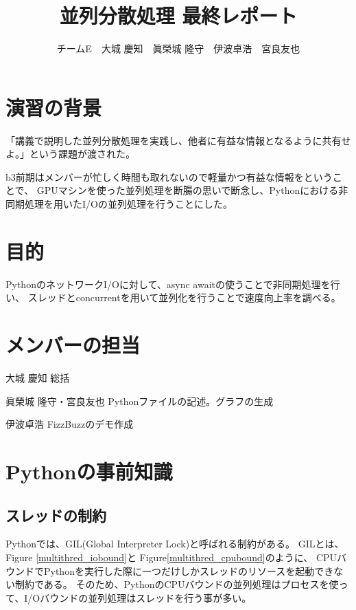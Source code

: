 \documentclass[14pt, oneside]{article}     	%
\title{並列分散処理  最終レポート}
\author{チームE　大城 慶知　眞榮城 隆守　伊波卓浩　宮良友也}
\begin{document}
\maketitle

%

\section{演習の背景}
「講義で説明した並列分散処理を実践し、他者に有益な情報となるように共有せよ。」という課題が渡された。

b3前期はメンバーが忙しく時間も取れないので軽量かつ有益な情報をということで、
GPUマシンを使った並列処理を断腸の思いで断念し、Pythonにおける非同期処理を用いたI/Oの並列処理を行うことにした。

\section{目的}
PythonのネットワークI/Oに対して、async awaitの使うことで非同期処理を行い、
スレッドとconcurrentを用いて並列化を行うことで速度向上率を調べる。

\section{メンバーの担当}

大城 慶知 総括

眞榮城 隆守・宮良友也 Pythonファイルの記述。グラフの生成

伊波卓浩 FizzBuzzのデモ作成

\section{Pythonの事前知識}

\subsection{スレッドの制約}
Pythonでは、GIL(Global Interpreter Lock)と呼ばれる制約がある。
GILとは、Figure \ref{multithred_iobound}と Figure\ref{multithred_cpubound}のように、
CPUバウンドでPythonを実行した際に一つだけしかスレッドのリソースを起動できない制約である。
そのため、PythonのCPUバウンドの並列処理はプロセスを使って、I/Oバウンドの並列処理はスレッドを行う事が多い。
\end{document}

